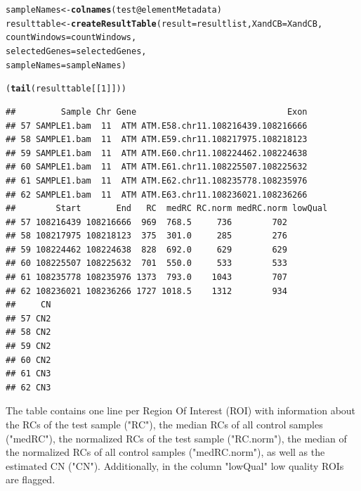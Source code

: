 \documentclass[article]{bioinf}\usepackage[]{graphicx}\usepackage[]{color}
\makeatletter
\newcommand{\hlnum}[1]{\textcolor[rgb]{0.686,0.059,0.569}{#1}}%
\newcommand{\hlopt}[1]{\textcolor[rgb]{0,0,0}{#1}}%
\newcommand{\hlstd}[1]{\textcolor[rgb]{0.345,0.345,0.345}{#1}}%
\newcommand{\hlkwb}[1]{\textcolor[rgb]{0.69,0.353,0.396}{#1}}%
\newcommand{\hlkwc}[1]{\textcolor[rgb]{0.333,0.667,0.333}{#1}}%
\newcommand{\hlkwd}[1]{\textcolor[rgb]{0.737,0.353,0.396}{\textbf{#1}}}%
\newenvironment{kframe}{%
 \def\at@end@of@kframe{}%
 \ifinner\ifhmode%
  \def\at@end@of@kframe{\end{minipage}}%
  \begin{minipage}{\columnwidth}%
 \fi\fi%
 \def\FrameCommand##1{\hskip\@totalleftmargin \hskip-\fboxsep
 \colorbox{shadecolor}{##1}\hskip-\fboxsep
     \hskip-\linewidth \hskip-\@totalleftmargin \hskip\columnwidth}%
 \MakeFramed {\advance\hsize-\width
   \@totalleftmargin\z@ \linewidth\hsize
   \@setminipage}}%
 {\par\unskip\endMakeFramed%
 \at@end@of@kframe}
\newenvironment{knitrout}{}{} %
\makeatother
\begin{document}
\begin{knitrout}
\color{fgcolor}\begin{kframe}
\begin{alltt}
\hlstd{sampleNames} \hlkwb{<-} \hlkwd{colnames}\hlstd{(test}\hlopt{@}\hlkwc{elementMetadata}\hlstd{)}
\hlstd{resulttable} \hlkwb{<-} \hlkwd{createResultTable}\hlstd{(}\hlkwc{result} \hlstd{= resultlist,} \hlkwc{XandCB} \hlstd{= XandCB,}
                                 \hlkwc{countWindows} \hlstd{= countWindows,}
                                 \hlkwc{selectedGenes} \hlstd{= selectedGenes,}
                                 \hlkwc{sampleNames} \hlstd{= sampleNames)}
\end{alltt}


{\ttfamily\noindent\itshape\color{messagecolor}{\#\# Calculating results for sample(s) SAMPLE1.bam}}

{\ttfamily\noindent\itshape\color{messagecolor}{\#\# Building table...}}

{\ttfamily\noindent\itshape\color{messagecolor}{\#\# Finished}}\begin{alltt}
\hlstd{(}\hlkwd{tail}\hlstd{(resulttable[[}\hlnum{1}\hlstd{]]))}
\end{alltt}
\begin{verbatim}
##         Sample Chr Gene                              Exon
## 57 SAMPLE1.bam  11  ATM ATM.E58.chr11.108216439.108216666
## 58 SAMPLE1.bam  11  ATM ATM.E59.chr11.108217975.108218123
## 59 SAMPLE1.bam  11  ATM ATM.E60.chr11.108224462.108224638
## 60 SAMPLE1.bam  11  ATM ATM.E61.chr11.108225507.108225632
## 61 SAMPLE1.bam  11  ATM ATM.E62.chr11.108235778.108235976
## 62 SAMPLE1.bam  11  ATM ATM.E63.chr11.108236021.108236266
##        Start       End   RC  medRC RC.norm medRC.norm lowQual
## 57 108216439 108216666  969  768.5     736        702        
## 58 108217975 108218123  375  301.0     285        276        
## 59 108224462 108224638  828  692.0     629        629        
## 60 108225507 108225632  701  550.0     533        533        
## 61 108235778 108235976 1373  793.0    1043        707        
## 62 108236021 108236266 1727 1018.5    1312        934        
##     CN
## 57 CN2
## 58 CN2
## 59 CN2
## 60 CN2
## 61 CN3
## 62 CN3
\end{verbatim}
\end{kframe}
\end{knitrout}

The table contains one line per Region Of Interest (ROI) with information about 
the RCs of the test sample ("RC"), 
the median RCs of all control samples ("medRC"), 
the normalized RCs of the test sample ("RC.norm"), 
the median of the normalized RCs of all control samples ("medRC.norm"), 
as well as the estimated CN ("CN"). 
Additionally, in the column "lowQual" low quality ROIs are flagged.
\end{document}
